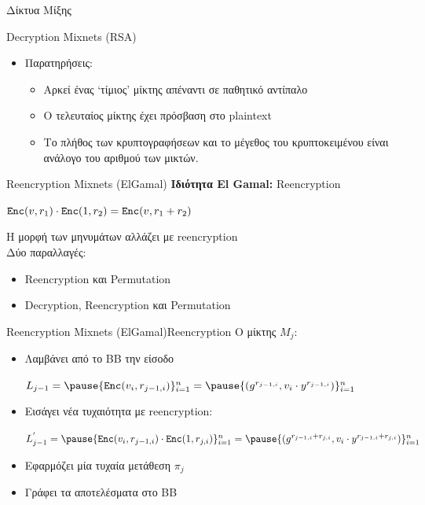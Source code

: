 \documentclass[handout]{beamer}
\begin{document}
\begin{section}{Δίκτυα Μίξης}
\begin{frame}{Decryption Mixnets (RSA)}
\begin{itemize}
    \item Παρατηρήσεις: \pause 
        \begin{itemize}
            \item Αρκεί ένας `τίμιος' μίκτης απέναντι σε παθητικό αντίπαλο
            \item Ο τελευταίος μίκτης έχει πρόσβαση στο plaintext
            \item Το πλήθος των κρυπτογραφήσεων και το μέγεθος του κρυπτοκειμένου είναι ανάλογο του αριθμού των μικτών.
        \end{itemize}
\end{itemize} 
\end{frame}

\begin{frame}{Reencryption Mixnets (ElGamal)}
   \textbf{Ιδιότητα El Gamal:} Reencryption
   \begin{center}
    $\mathtt{Enc}(v, r_1) \cdot \mathtt{Enc}(1, r_2) = \mathtt{Enc}(v,r_1+r_2)$
   \end{center} \pause 
    Η μορφή των μηνυμάτων αλλάζει με reencryption \\
    Δύο παραλλαγές:
    \begin{itemize}
        \item Reencryption και Permutation  \pause

        \item Decryption, Reencryption και Permutation 
    \end{itemize} 
\end{frame}

\begin{frame}{Reencryption Mixnets (ElGamal)}{Reencryption}
        Ο μίκτης $M_j$:
        \begin{itemize}
            \item Λαμβάνει από το ΒΒ την είσοδο 
            \begin{center} $L_{j-1} = \pause \{ \enc(v_i,r_{j-1,i}) \}_{i=1}^n = \pause \{ (g^{r_{j-1,i}}, v_i \cdot y^{r_{j-1,i}}) \}_{i=1}^n$  \end{center} \pause
            \item Εισάγει νέα τυχαιότητα με reencryption:
            \begin{center}$L_{j-1}^{'} =  \pause  \{ \enc(v_i,r_{j-1,i}) \cdot \enc(1, r_{j,i})  \}_{i=1}^n = \pause
    	        \{ (g^{r_{j-1,i}+r_{j,i}}, v_i \cdot y^{r_{j-1,i}+r_{j,i}}) \}_{i=1}^n $  
            \end{center} \pause
            \item Εφαρμόζει μία τυχαία μετάθεση $\pi_j$ \pause
            \item Γράφει τα αποτελέσματα στο BB
        \end{itemize}  
 \end{frame}
 

\end{section}
\end{document}
